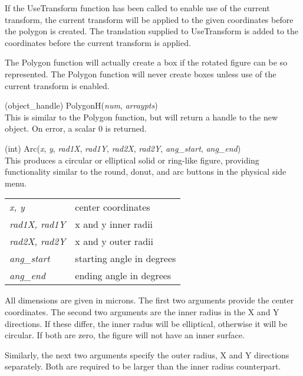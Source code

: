 \begin{description}
If the {\vt UseTransform} function has been called to enable use of
the current transform, the current transform will be applied to the
given coordinates before the polygon is created.  The translation
supplied to {\vt UseTransform} is added to the coordinates before the
current transform is applied.

The {\vt Polygon} function will actually create a box if the rotated
figure can be so represented.  The {\vt Polygon} function will never
create boxes unless use of the current transform is enabled.

\item{(object\_handle) \vt PolygonH({\it num\/}, {\it arraypts\/})}\\
This is similar to the {\vt Polygon} function, but will return a
handle to the new object.  On error, a scalar 0 is returned.

\item{(int) \vt Arc({\it x\/}, {\it y\/}, {\it rad1X\/}, {\it rad1Y\/},
 {\it rad2X\/}, {\it rad2Y\/}, {\it ang\_start\/}, {\it ang\_end\/})}\\
This produces a circular or elliptical solid or ring-like figure,
providing functionality similar to the {\cb round}, {\cb donut}, and
{\cb arc} buttons in the physical side menu.

\begin{tabular}{ll}
\it x, y & center coordinates\\
\it rad1X, rad1Y & x and y inner radii\\
\it rad2X, rad2Y & x and y outer radii\\
\it ang\_start & starting angle in degrees\\
\it ang\_end & ending angle in degrees\\
\end{tabular}

All dimensions are given in microns.  The first two arguments provide
the center coordinates.  The second two arguments are the inner radius
in the X and Y directions.  If these differ, the inner radus will be
elliptical, otherwise it will be circular.  If both are zero, the
figure will not have an inner surface.

Similarly, the next two arguments specify the outer radius, X and Y
directions separately.  Both are required to be larger than the inner
radius counterpart.


\end{description}
